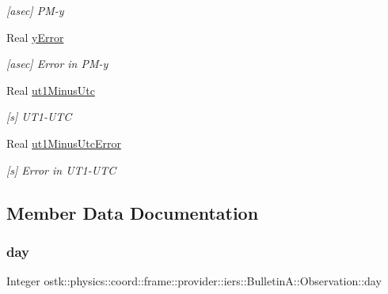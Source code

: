 \begin{DoxyCompactItemize}
\begin{DoxyCompactList}\small\item\em \mbox{[}asec\mbox{]} P\+M-\/y \end{DoxyCompactList}\item 
Real \hyperlink{structostk_1_1physics_1_1coord_1_1frame_1_1provider_1_1iers_1_1_bulletin_a_1_1_observation_a1dd5c9292450189cb83261201a76efe8}{y\+Error}
\begin{DoxyCompactList}\small\item\em \mbox{[}asec\mbox{]} Error in P\+M-\/y \end{DoxyCompactList}\item 
Real \hyperlink{structostk_1_1physics_1_1coord_1_1frame_1_1provider_1_1iers_1_1_bulletin_a_1_1_observation_aa660ce077d59627bdfc1e1c56641bc5b}{ut1\+Minus\+Utc}
\begin{DoxyCompactList}\small\item\em \mbox{[}s\mbox{]} U\+T1-\/\+U\+TC \end{DoxyCompactList}\item 
Real \hyperlink{structostk_1_1physics_1_1coord_1_1frame_1_1provider_1_1iers_1_1_bulletin_a_1_1_observation_a4e4889123719ede54a1ee4d786bfc883}{ut1\+Minus\+Utc\+Error}
\begin{DoxyCompactList}\small\item\em \mbox{[}s\mbox{]} Error in U\+T1-\/\+U\+TC \end{DoxyCompactList}\end{DoxyCompactItemize}


\subsection{Member Data Documentation}
\mbox{\label{structostk_1_1physics_1_1coord_1_1frame_1_1provider_1_1iers_1_1_bulletin_a_1_1_observation_a4bb1b8697d74b570e4fd133eacbe6d08}} 
\subsubsection{\texorpdfstring{day}{day}}
{\footnotesize\ttfamily Integer ostk\+::physics\+::coord\+::frame\+::provider\+::iers\+::\+Bulletin\+A\+::\+Observation\+::day}



